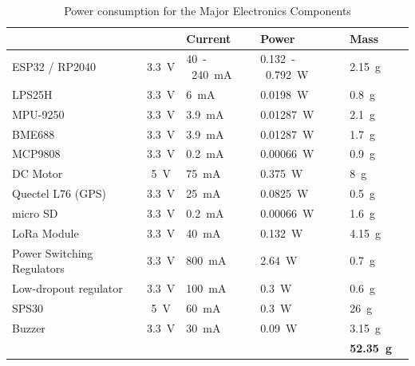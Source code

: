 \begin{table}[htbp]
\centering
{}
\begin{tabular}{>{\raggedright\arraybackslash}p{5cm}c>{\raggedleft\arraybackslash}p{2cm}
>{\raggedleft\arraybackslash}p{3cm}>{\centering\arraybackslash}p{2cm}>{\centering\arraybackslash}p{2cm}}
\hline
\rowcolor{CDOSRPrimary}
\textbf{\color{white!50}{Component}} & \textbf{\color{white!50}{Voltage}} & \textbf{\color{white!50}\textbf{Current}} & \textbf{\color{white!50}\textbf{Power}} & \textbf{\color{white!50}\textbf{Mass}} \\ \hline
\rowcolors{2}{red}{}
ESP32 / RP2040 & \SI{3.3}{\volt} & \SI{40}-\SI{240}{\milli\ampere} & \SI{0.132}-\SI{0.792}{\watt} & \SI{2.15}{\gram}  \\
\rowcolor{CDOSRSecondary!50}LPS25H & \SI{3.3}{\volt} & \SI{6}{\milli\ampere} & \SI{0.0198}{\watt} & \SI{0.8}{\gram}  \\
MPU-9250 & \SI{3.3}{\volt} & \SI{3.9}{\milli\ampere} &  \SI{0.01287}{\watt} &\SI{2.1}{\gram} \\
\rowcolor{CDOSRSecondary!50}BME688 & \SI{3.3}{\volt} & \SI{3.9}{\milli\ampere} & \SI{0.01287}{\watt} & \SI{1.7}{\gram}  \\
MCP9808 & \SI{3.3}{\volt} & \SI{0.2}{\milli\ampere} &  \SI{0.00066}{\watt} &\SI{0.9}{\gram} \\
\rowcolor{CDOSRSecondary!50}DC Motor & \SI{5}{\volt} & \SI{75}{\milli\ampere} &  \SI{0.375}{\watt} &\SI{8}{\gram}  \\
Quectel L76 (GPS) & \SI{3.3}{\volt} &  \SI{25}{\milli\ampere} &  \SI{0.0825}{\watt} & \SI{0.5}{\gram} \\
\rowcolor{CDOSRSecondary!50}micro SD & \SI{3.3}{\volt} & \SI{0.2}{\milli\ampere} &  \SI{0.00066}{\watt} &\SI{1.6}{\gram} \\
LoRa Module & \SI{3.3}{\volt} & \SI{40}{\milli\ampere} &  \SI{0.132}{\watt} &\SI{4.15}{\gram} \\
\rowcolor{CDOSRSecondary!50}Power Switching Regulators & \SI{3.3}{\volt} &\SI{800}{\milli\ampere}&  \SI{2.64}{\watt} &\SI{0.7}{\gram}\\
Low-dropout regulator & \SI{3.3}{\volt} &\SI{100}{\milli\ampere}&  \SI{0.3}{\watt} &\SI{0.6}{\gram}  \\
\rowcolor{CDOSRSecondary!50}SPS30 & \SI{5}{\volt} & \SI{60}{\milli\ampere} & \SI{0.3}{\watt} &\SI{26}{\gram} \\ 
Buzzer & \SI{3.3}{\volt} &\SI{30}{\milli\ampere}&  \SI{0.09}{\watt} &\SI{3.15}{\gram}  \\
\rowcolor{CDOSRPrimary}
\textbf{\color{white!50}{Total Power}} & & & \textbf{\color{white!50}{\SI{4.75}{\watt}}} & \textbf{\color{white!50}\SI{52.35}{\gram}}  \\
\hline
\end{tabular}
\caption{\small{Power consumption for the Major Electronics Components}}
\end{table}


